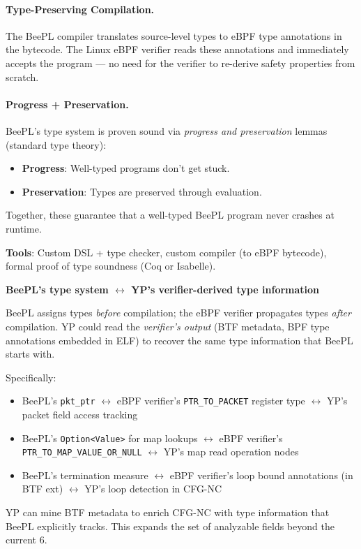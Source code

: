 \paragraph{Type-Preserving Compilation.}
The BeePL compiler translates source-level types to eBPF type annotations in the bytecode. The Linux eBPF verifier reads these annotations and immediately accepts the program --- no need for the verifier to re-derive safety properties from scratch.

\paragraph{Progress + Preservation.}
BeePL's type system is proven sound via \emph{progress and preservation} lemmas (standard type theory):
\begin{itemize}
  \item \textbf{Progress}: Well-typed programs don't get stuck.
  \item \textbf{Preservation}: Types are preserved through evaluation.
\end{itemize}
Together, these guarantee that a well-typed BeePL program never crashes at runtime.

\textbf{Tools}: Custom DSL + type checker, custom compiler (to eBPF bytecode), formal proof of type soundness (Coq or Isabelle).

\begin{analogybox}
\textbf{BeePL's type system $\leftrightarrow$ YP's verifier-derived type information}

BeePL assigns types \emph{before} compilation; the eBPF verifier propagates types \emph{after} compilation. YP could read the \emph{verifier's output} (BTF metadata, BPF type annotations embedded in ELF) to recover the same type information that BeePL starts with.

Specifically:
\begin{itemize}
  \item BeePL's \texttt{pkt\_ptr} $\leftrightarrow$ eBPF verifier's \texttt{PTR\_TO\_PACKET} register type $\leftrightarrow$ YP's packet field access tracking
  \item BeePL's \texttt{Option<Value>} for map lookups $\leftrightarrow$ eBPF verifier's \texttt{PTR\_TO\_MAP\_VALUE\_OR\_NULL} $\leftrightarrow$ YP's map read operation nodes
  \item BeePL's termination measure $\leftrightarrow$ eBPF verifier's loop bound annotations (in BTF ext) $\leftrightarrow$ YP's loop detection in CFG-NC
\end{itemize}
YP can mine BTF metadata to enrich CFG-NC with type information that BeePL explicitly tracks. This expands the set of analyzable fields beyond the current 6.
\end{analogybox}

